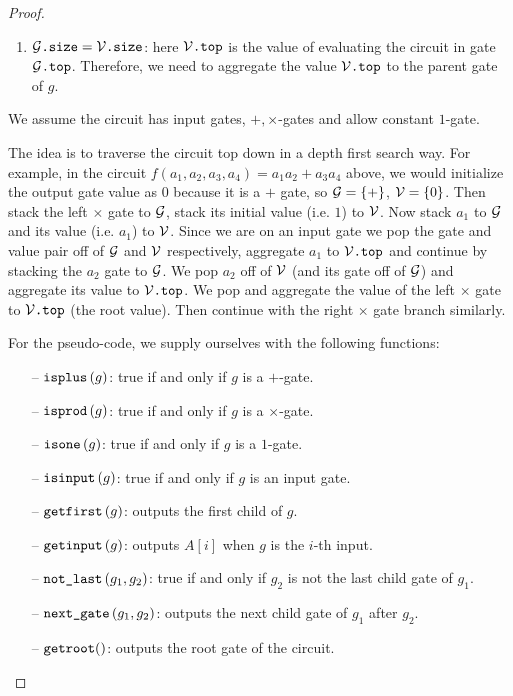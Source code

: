 \begin{proof}
\begin{enumerate}
        \item $\mathcal{G}\texttt{.size} = \mathcal{V}\texttt{.size}$: here $\mathcal{V}\texttt{.top}$ is the value of evaluating the circuit in gate $\mathcal{G}\texttt{.top}$. Therefore, we need to aggregate the value $\mathcal{V}\texttt{.top}$ to the parent gate of $g$.
    \end{enumerate}

    We assume the circuit has input gates, $+, \times$-gates and allow constant $1$-gate.

    The idea is to traverse the circuit top down in a depth first search way. For example, in the circuit $f(a_1,a_2,a_3,a_4)=a_1a_2 +a_3a_4$ above, we would initialize the output gate value as $0$ because it is a $+$ gate, so $\mathcal{G}=\lbrace +\rbrace$, $\mathcal{V}=\lbrace 0\rbrace$. Then stack the left $\times$ gate to $\mathcal{G}$, stack its initial value (i.e. $1$) to $\mathcal{V}$. Now stack $a_1$ to $\mathcal{G}$ and its value (i.e. $a_1$) to $\mathcal{V}$. Since we are on an input gate we pop the gate and value pair off of $\mathcal{G}$ and $\mathcal{V}$ respectively, aggregate $a_1$ to $\mathcal{V}\texttt{.top}$ and continue by stacking the $a_2$ gate to $\mathcal{G}$. We pop $a_2$ off of $\mathcal{V}$ (and its gate off of $\mathcal{G}$) and aggregate its value to $\mathcal{V}\texttt{.top}$. We pop and aggregate the value of the left $\times$ gate to $\mathcal{V}\texttt{.top}$ (the root value). Then continue with the right $\times$ gate branch similarly.

    For the pseudo-code, we supply ourselves with the following functions:

    \begin{itemize}
        \item[--] $\texttt{isplus}\left( g \right)$: true if and only if $g$ is a $+$-gate.
        \item[--] $\texttt{isprod}\left(g \right)$: true if and only if $g$ is a $\times$-gate.
        \item[--] $\texttt{isone}\left(g \right)$: true if and only if $g$ is a $1$-gate.
        \item[--] $\texttt{isinput}\left(g \right)$: true if and only if $g$ is an input gate.
        \item[--] $\texttt{getfirst}\left(g \right)$: outputs the first child of $g$.
        \item[--] $\texttt{getinput}\left(g \right)$: outputs $A[i]$ when $g$ is the $i$-th input.
        \item[--] $\texttt{not{\_}last}\left(g_1,g_2 \right)$: true if and only if $g_2$ is not the last child gate of $g_1$.
        \item[--] $\texttt{next{\_}gate}\left(g_1, g_2 \right)$: outputs the next child gate of $g_1$ after $g_2$.
        \item[--] $\texttt{getroot}()$: outputs the root gate of the circuit.
    \end{itemize}


\end{proof}
